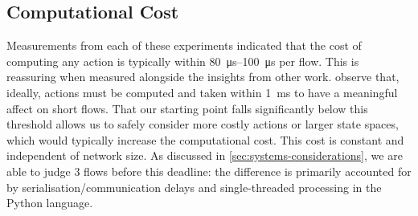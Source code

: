 \documentclass[10pt, times, comsoc]{IEEEtran}
\begin{document}
\begin{table}
\cbstart
	\centering
	\caption{Average reward versus attack volume.\label{tab:atk-vol}}
\cbend
\vspace{-0.75cm}
\end{table}

\subsection{Computational Cost}

Measurements from each of these experiments indicated that the cost of computing any action is typically within \SIrange{80}{100}{\micro\second} per flow.
This is reassuring when measured alongside the insights from other work.
\Textcite{DBLP:conf/sigcomm/ChenL0L18} observe that, ideally, actions must be computed and taken within \SI{1}{\milli\second} to have a meaningful affect on short flows.
That our starting point falls significantly below this threshold allows us to safely consider more costly actions or larger state spaces, which would typically increase the computational cost.
\cbstart
{\color{revisiontext}This cost is constant and independent of network size.
As discussed in \cref{sec:systems-considerations}, we are able to judge 3 flows before this deadline: the difference is primarily accounted for by serialisation/communication delays and single-threaded processing in the Python language.}
\cbend
\end{document}

